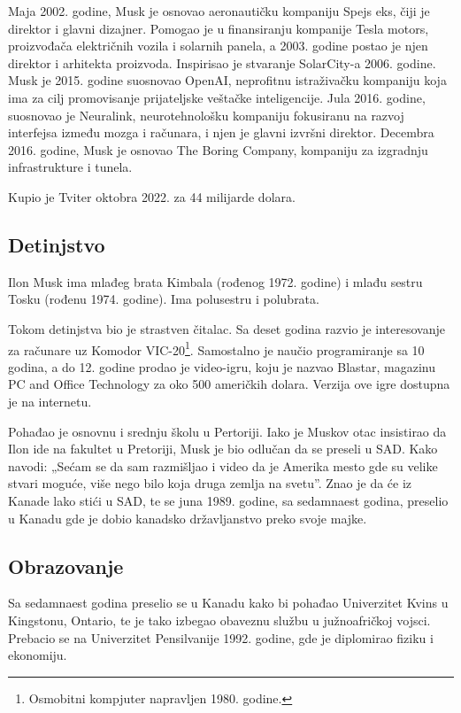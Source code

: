 \documentclass[a4paper,11pt]{article}
\begin{document}
Maja 2002. godine, Musk je osnovao aeronautičku kompaniju Spejs eks, čiji je direktor i glavni dizajner. Pomogao je u finansiranju kompanije Tesla motors, proizvođača električnih vozila i solarnih panela, a 2003. godine postao je njen direktor i arhitekta proizvoda. Inspirisao je stvaranje SolarCity-a 2006. godine. Musk je 2015. godine suosnovao OpenAI, neprofitnu istraživačku kompaniju koja ima za cilj promovisanje prijateljske veštačke inteligencije. Jula 2016. godine, suosnovao je Neuralink, neurotehnološku kompaniju fokusiranu na razvoj interfejsa između mozga i računara, i njen je glavni izvršni direktor. Decembra 2016. godine, Musk je osnovao The Boring Company, kompaniju za izgradnju infrastrukture i tunela.

Kupio je Tviter oktobra 2022. za 44 milijarde dolara.

\subsection{Detinjstvo}
\label{subsec:Detinjstvo}

Ilon Musk ima mlađeg brata Kimbala (rođenog 1972. godine) i mlađu sestru Tosku (rođenu 1974. godine). Ima polusestru i polubrata.

Tokom detinjstva bio je strastven čitalac. Sa deset godina razvio je interesovanje za računare uz Komodor VIC-20\footnote[1]{Osmobitni kompjuter napravljen 1980. godine.}. Samostalno je naučio programiranje sa 10 godina, a do 12. godine prodao je video-igru, koju je nazvao Blastar, magazinu PC and Office Technology za oko 500 američkih dolara. Verzija ove igre dostupna je na internetu.

Pohađao je osnovnu i srednju školu u Pertoriji. Iako je Muskov otac insistirao da Ilon ide na fakultet u Pretoriji, Musk je bio odlučan da se preseli u SAD. Kako navodi: „Sećam se da sam razmišljao i video da je Amerika mesto gde su velike stvari moguće, više nego bilo koja druga zemlja na svetu”. Znao je da će iz Kanade lako stići u SAD, te se juna 1989. godine, sa sedamnaest godina, preselio u Kanadu gde je dobio kanadsko državljanstvo preko svoje majke.

\subsection{Obrazovanje}
\label{subsec:Obrazovanje}


Sa sedamnaest godina preselio se u Kanadu kako bi pohađao Univerzitet Kvins u Kingstonu, Ontario, te je tako izbegao obaveznu službu u južnoafričkoj vojsci. Prebacio se na Univerzitet Pensilvanije 1992. godine, gde je diplomirao fiziku i ekonomiju.
\end{document}
